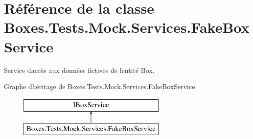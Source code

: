 \hypertarget{class_boxes_1_1_tests_1_1_mock_1_1_services_1_1_fake_box_service}{}\section{Référence de la classe Boxes.\+Tests.\+Mock.\+Services.\+Fake\+Box\+Service}
\label{class_boxes_1_1_tests_1_1_mock_1_1_services_1_1_fake_box_service}


Service d\textquotesingle{}accès aux données fictives de l\textquotesingle{}entité Box.  


Graphe d\textquotesingle{}héritage de Boxes.\+Tests.\+Mock.\+Services.\+Fake\+Box\+Service\+:\begin{figure}[H]
\begin{center}
\leavevmode
\includegraphics[height=2.000000cm]{class_boxes_1_1_tests_1_1_mock_1_1_services_1_1_fake_box_service}
\end{center}
\end{figure}
